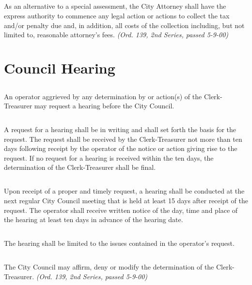 \subsection{}
As an alternative to a special assessment, the City Attorney shall have the express authority to commence any legal action or actions to collect the tax and/or penalty due and, in addition, all costs of the collection including, but not limited to, reasonable attorney’s fees.\newline
\emph{(Ord. 139, 2nd Series, passed 5-9-00)}

\section{Council Hearing}
\subsection{}
An operator aggrieved by any determination by or action(s) of the Clerk-Treasurer may request a hearing before the City Council.
\subsection{}
A request for a hearing shall be in writing and shall set forth the basis for the request.  The request shall be received by the Clerk-Treasurer not more than ten days following receipt by the operator of the notice or action giving rise to the request.  If no request for a hearing is received within the ten days, the determination of the Clerk-Treasurer shall be final.
\subsection{}
Upon receipt of a proper and timely request, a hearing shall be conducted at the next regular City Council meeting that is held at least 15 days after receipt of the request.  The operator shall receive written notice of the day, time and place of the hearing at least ten days in advance of the hearing date.
\subsection{}
The hearing shall be limited to the issues contained in the operator’s request.
\subsection{}
The City Council may affirm, deny or modify the determination of the Clerk-Treasurer.\newline
\emph{(Ord. 139, 2nd Series, passed 5-9-00)}

